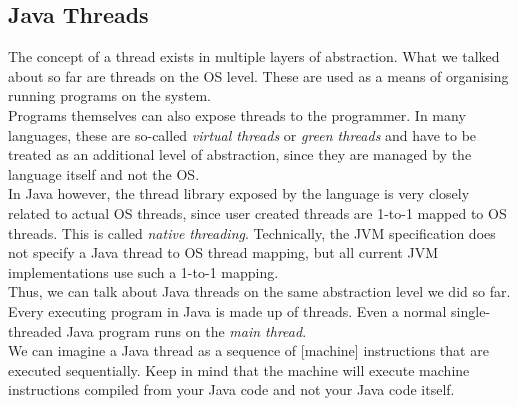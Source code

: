 \documentclass[main]{subfiles}
\begin{document}
%
%
\subsection{Java Threads}
The concept of a thread exists in multiple layers of abstraction. What we talked about so far are threads on the OS level. These are used as a means of organising running programs on the system.\\[3mm]
Programs themselves can also expose threads to the programmer. In many languages, these are so-called \textit{virtual threads} or \textit{green threads} and have to be treated as an additional level of abstraction, since they are managed by the language itself and not the OS.\\
In Java however, the thread library exposed by the language is very closely related to actual OS threads, since user created threads are 1-to-1 mapped to OS threads. This is called \textit{native threading}. Technically, the JVM specification does not specify a Java thread to OS thread mapping, but all current JVM implementations use such a 1-to-1 mapping.\\
Thus, we can talk about Java threads on the same abstraction level we did so far. Every executing program in Java is made up of threads. Even a normal single-threaded Java program runs on the \textit{main thread}.\\
We can imagine a Java thread as a sequence of [machine] instructions that are executed sequentially. Keep in mind that the machine will execute machine instructions compiled from your Java code and not your Java code itself.
\end{document}

